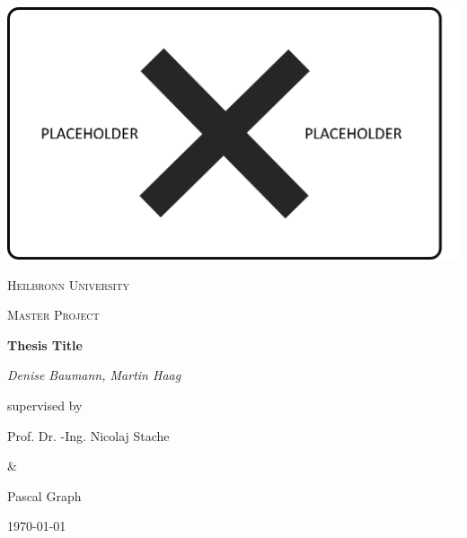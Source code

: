 \begin{titlepage}
	\centering
	\includegraphics[width=1\textwidth]{images/PLACEHOLDER}\par\vspace{1cm}
	{\scshape\LARGE Heilbronn University \par}
	\vspace{1cm}
	{\scshape\Large Master Project\par}
	\vspace{1.5cm}
	{\huge\bfseries Thesis Title\par}
	\vspace{1.5cm}
	{\Large\itshape Denise Baumann, Martin Haag\par}
	\vfill
	supervised by\par
	\vspace{0.2cm}
	Prof. Dr. -Ing. Nicolaj Stache \par \& \par Pascal Graph
	\vfill
	{\large \today\par}
\end{titlepage}

